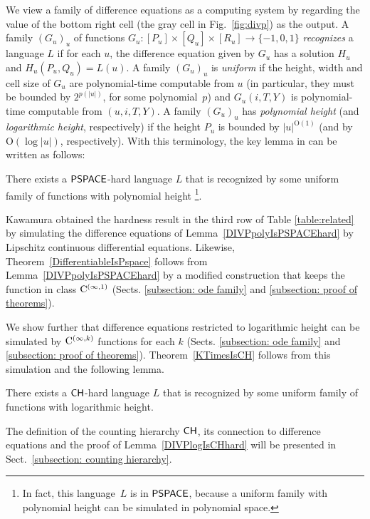 We view a family of difference equations as a computing system by
regarding the value of the bottom right cell (the gray cell in Fig.~\ref{fig:divp}) as the output. 
A family $(G_u)_u$ of functions 
$G_u \colon [P_u] \times [Q_u] \times [R_u] \to \{-1, 0, 1\}$
\emph{recognizes} a language $L$ if for each $u$,
the difference equation given by $G_u$ has a solution $H_u$ 
and $H_u(P_u, Q_u) = L(u)$.
A family $(G_u)_u$ is \emph{uniform} 
if the height, width and cell size of $G_u$ are 
polynomial-time computable from $u$ (in particular, 
they must be bounded by $2^{p(|u|)}$, for some polynomial~$p$)
and $G_u(i, T, Y)$ is polynomial-time computable from $(u, i, T, Y)$.
A family $(G_u)_u$ has \emph{polynomial height} 
(and \emph{logarithmic height}, respectively)
if the height $P_u$ is bounded by $|u| ^{\mathrm O (1)}$
(and by $\mathrm O (\log |u|)$, respectively).
With this terminology,
the key lemma in 
\cite[Lemma 4.7]{kawamura2010lipschitz} 
can be written as follows:
\begin{lemma}
 \label{DIVPpolyIsPSPACEhard}
 There exists a $\mathsf{PSPACE}$-hard language $L$ that is recognized by some uniform family of functions with polynomial height%
 \footnote{In fact, 
this language~$L$ is in $\mathsf{PSPACE}$, 
because a uniform family with polynomial height 
can be simulated in polynomial space.
}.
\end{lemma}

Kawamura obtained the hardness result in the third row of Table \ref{table:related} 
by simulating the difference equations of Lemma~\ref{DIVPpolyIsPSPACEhard}
by Lipschitz continuous differential equations. 
Likewise, 
Theorem~\ref{DifferentiableIsPspace} follows from Lemma~\ref{DIVPpolyIsPSPACEhard}
by a modified construction that keeps 
the function in class $\mathrm C ^{(\infty, 1)}$ 
(Sects. \ref{subsection: ode family} and \ref{subsection: proof of theorems}).

We show further that 
difference equations restricted to logarithmic height can be simulated by
$\mathrm C ^{(\infty, k)}$ functions for each $k$ 
(Sects. \ref{subsection: ode family} and \ref{subsection: proof of theorems}).
Theorem~\ref{KTimesIsCH} follows from this simulation and the following lemma.
\begin{lemma}
 \label{DIVPlogIsCHhard}
 There exists a $\mathsf{CH}$-hard language $L$ that is recognized by some uniform family of functions with logarithmic height.
\end{lemma}

The definition of the counting hierarchy $\mathsf{CH}$, 
its connection to difference equations and 
the proof of Lemma~\ref{DIVPlogIsCHhard} 
will be presented in Sect.~\ref{subsection: counting hierarchy}. 



